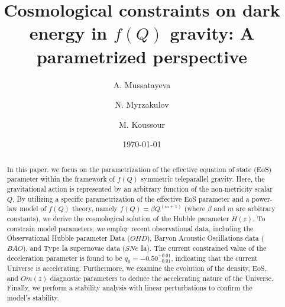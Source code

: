 \documentclass[prd,superscriptaddress,amsfonts,amssymb,amsmath,showpacs,twocolumn]{revtex4-2}
\begin{document}
\color{black}       %

\title{Cosmological constraints on dark energy in $f(Q)$ gravity: A parametrized perspective}

\author{A. Mussatayeva }

\author{N. Myrzakulov}

\author{M. Koussour}


\date{\today}

\begin{abstract}
In this paper, we focus on the parametrization of the effective equation of state (EoS) parameter within the framework of $f(Q)$ symmetric teleparallel gravity. Here, the gravitational action is represented by an arbitrary function of the non-metricity scalar $Q$. By utilizing a specific parametrization of the effective EoS parameter and a power-law model of $f(Q)$ theory, namely $f(Q)=\beta Q^{\left( m+1\right) }$ (where $\beta$ and $m$ are arbitrary constants), we derive the cosmological solution of the Hubble parameter $H(z)$. To constrain model parameters, we employ recent observational data, including the Observational Hubble parameter Data ($OHD$), Baryon Acoustic Oscillations data ($BAO$), and Type Ia supernovae data ($SNe$ Ia). The current constrained value of the deceleration parameter is found to be $q_{0}=-0.50^{+0.01}_{-0.01}$, indicating that the current Universe is accelerating. Furthermore, we examine the evolution of the density, EoS, and $Om(z)$ diagnostic parameters to deduce the accelerating nature of the Universe. Finally, we perform a stability analysis with linear perturbations to confirm the model's stability.
\end{abstract}

\maketitle
\end{document}
